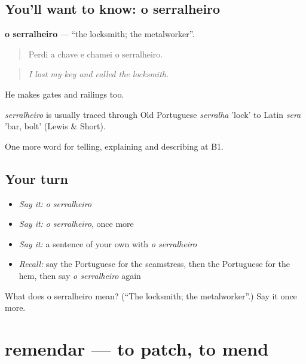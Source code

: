 \subsection*{You'll want to know: o serralheiro}
\textbf{o serralheiro} — \textquotedblleft{}the locksmith; the metalworker\textquotedblright{}.

\begin{quote}
Perdi a chave e chamei o serralheiro.
\end{quote}

\begin{quote}
\emph{I lost my key and called the locksmith.}
\end{quote}

He makes gates and railings too.

\begin{cousinweb}
\emph{serralheiro} is usually traced through Old Portuguese \emph{serralha} 'lock' to Latin \emph{sera} 'bar, bolt' (Lewis \& Short).
\end{cousinweb}

\begin{grammarlens}[title={What you've built}]
One more word for telling, explaining and describing at B1.
\end{grammarlens}

\subsection*{Your turn}
\begin{itemize}
\raggedright
  \item \emph{Say it:} \emph{o serralheiro}
  \item \emph{Say it:} \emph{o serralheiro}, once more
  \item \emph{Say it:} a sentence of your own with \emph{o serralheiro}
  \item \emph{Recall:} say the Portuguese for the seamstress, then the Portuguese for the hem, then say \emph{o serralheiro} again
\end{itemize}

\begin{tcolorbox}[breakable,colback=teal!4,colframe=teal!35!black,title={Before you move on}]
What does o serralheiro mean? (\textquotedblleft{}The locksmith; the metalworker\textquotedblright{}.) Say it once more.
\end{tcolorbox}
\section[remendar]{remendar — to patch, to mend}

